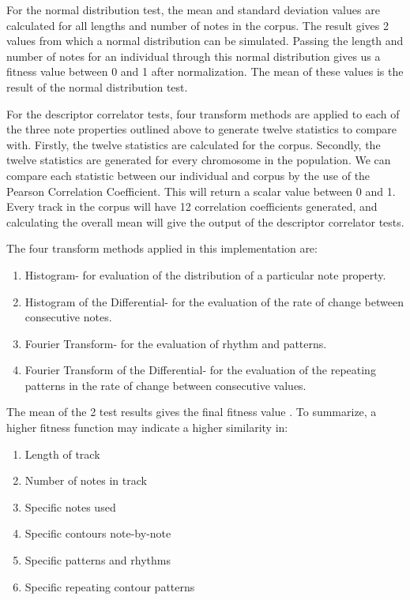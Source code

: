 \documentclass[conference]{IEEEtran}
\begin{document}
For the normal distribution test, the mean and standard deviation values are calculated for all lengths and number of notes in the corpus. The result gives 2 values from which a normal distribution can be simulated. Passing the length and number of notes for an individual through this normal distribution gives us a fitness value between 0 and 1 after normalization. The mean of these values is the result of the normal distribution test.

For the descriptor correlator tests, four transform methods are applied to each of the three note properties outlined above to generate twelve statistics to compare with. Firstly, the twelve statistics are calculated for the corpus. Secondly, the twelve statistics are generated for every chromosome in the population. We can compare each statistic between our individual and corpus by the use of the Pearson Correlation Coefficient. This will return a scalar value between 0 and 1. Every track in the corpus will have 12 correlation coefficients generated, and calculating the overall mean will give the output of the descriptor correlator tests.

The four transform methods applied in this implementation are:
\begin{enumerate}
    \item Histogram- for evaluation of the distribution of a particular note property.
    \item Histogram of the Differential- for the evaluation of the rate of change between consecutive notes.
    \item Fourier Transform- for the evaluation of rhythm and patterns.
\item Fourier Transform of the Differential- for the evaluation of the repeating patterns in the rate of change between consecutive values.
\end{enumerate}

The mean of the 2 test results gives the final fitness value \cite{b1}. To summarize, a higher fitness function may indicate a higher similarity in:
\begin{enumerate}
    \item Length of track
    \item Number of notes in track
    \item Specific notes used
    \item Specific contours note-by-note 
    \item Specific patterns and rhythms
    \item Specific repeating contour patterns
\end{enumerate}
\end{document}

